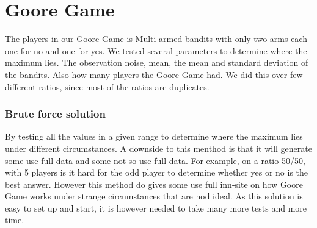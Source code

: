 \section{Goore Game}
The players in our Goore Game is Multi-armed bandits with only two arms each one for no and one for yes.
We tested several parameters to determine where the maximum lies. The observation noise, mean, the mean
and standard deviation of the bandits. Also how many players the Goore Game had. We did this over few different
ratios, since most of the ratios are duplicates. 

\subsubsection{Brute force solution}
By testing all the values in a given range to determine where the maximum lies under different
circumstances. A downside to this menthod is that it will generate some use full data and some not so
use full data. For example, on a ratio 50/50, with 5 players is it hard for the  odd player to 
determine whether yes or no is the best answer. However this method do gives some use full inn-site on
how Goore Game works under strange circumstances that are nod ideal. As this solution is easy to set
up and start, it is however needed to take many more tests and more time.


% 
% 
% 
% 
% 
% 
% 
% 
% 
% 
% 
